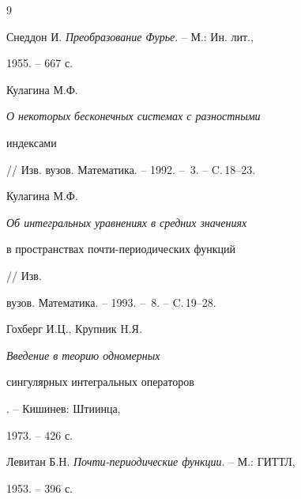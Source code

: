  


\begin{thebibliography}{9} 


 




Снеддон И. {\em Преобразование Фурье}. -- М.: Ин. лит., 


1955. -- 667 с. 




Кулагина М.Ф. {\em О некоторых бесконечных системах с разностными 


индексами} // Изв. вузов. Математика. -- 1992. -- \No\,3. -- C.\,18--23. 




Кулагина М.Ф. {\em Об интегральных уравнениях в средних значениях 


в пространствах почти-периодических функций} // Изв. 


вузов. Математика. -- 1993. -- \No\,8. -- C.\,19--28. 




Гохберг И.Ц., Крупник H.Я. {\em Введение в теорию одномерных 


сингулярных интегральных операторов}. -- Кишинев: Штиинца, 


1973. -- 426 с. 




Левитан Б.Н. {\em Почти-периодические функции}. -- М.: ГИТТЛ, 


1953. -- 396 с. 


 


\end{thebibliography} 


 


\vskip 2cm 


 






 


\label{end} 


 





